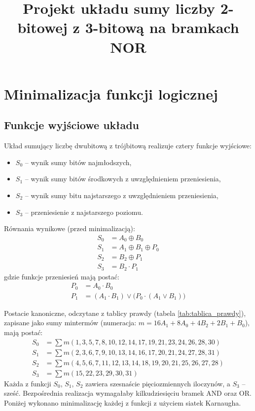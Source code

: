 \documentclass[11pt]{article}
\title{Projekt układu sumy liczby 2-bitowej z 3-bitową na bramkach NOR}
\author{}
\date{}
\begin{document}
\maketitle

\section{Minimalizacja funkcji logicznej}

\subsection{Funkcje wyjściowe układu}

Układ sumujący liczbę dwubitową z trójbitową realizuje cztery funkcje wyjściowe:
\begin{itemize}
    \item \(S_0\) -- wynik sumy bitów najmłodszych,
    \item \(S_1\) -- wynik sumy bitów środkowych z uwzględnieniem przeniesienia,
    \item \(S_2\) -- wynik sumy bitu najstarszego z uwzględnieniem przeniesienia,
    \item \(S_3\) -- przeniesienie z najstarszego poziomu.
\end{itemize}

Równania wynikowe (przed minimalizacją):
\begin{align}
S_0 &= A_0 \oplus B_0 \\
S_1 &= A_1 \oplus B_1 \oplus P_0 \\
S_2 &= B_2 \oplus P_1 \\
S_3 &= B_2 \cdot P_1
\end{align}
gdzie funkcje przeniesień mają postać:
\begin{align}
P_0 &= A_0 \cdot B_0 \\
P_1 &= (A_1 \cdot B_1) \lor \bigl(P_0 \cdot (A_1 \lor B_1)\bigr)
\end{align}

Postacie kanoniczne, odczytane z tablicy prawdy (tabela \ref{tab:tablica_prawdy}), zapisane jako sumy mintermów (numeracja: \(m = 16A_1 + 8A_0 + 4B_2 + 2B_1 + B_0\)), mają postać:
\begin{align}
S_0 &= \sum m(1,3,5,7,8,10,12,14,17,19,21,23,24,26,28,30) \\
S_1 &= \sum m(2,3,6,7,9,10,13,14,16,17,20,21,24,27,28,31) \\
S_2 &= \sum m(4,5,6,7,11,12,13,14,18,19,20,21,25,26,27,28) \\
S_3 &= \sum m(15,22,23,29,30,31)
\end{align}
Każda z funkcji \(S_0\), \(S_1\), \(S_2\) zawiera szesnaście pięciozmiennych iloczynów, a \(S_3\) -- sześć. Bezpośrednia realizacja wymagałaby kilkudziesięciu bramek AND oraz OR. Poniżej wykonano minimalizację każdej z funkcji z użyciem siatek Karnaugha.
\end{document}
